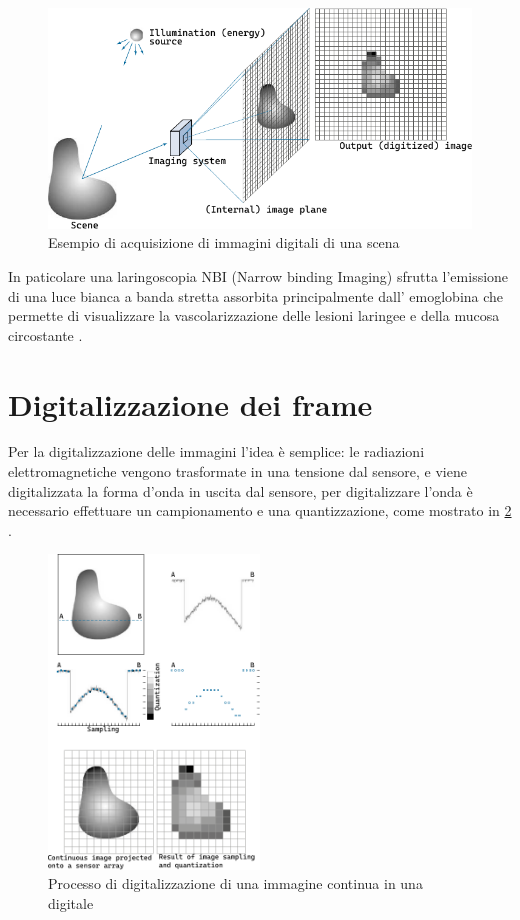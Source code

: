 \begin{figure}[ht]
    \centering
    \includegraphics[width=1\textwidth]{frame/digital_image_acquisition.pdf}
    \caption{Esempio di acquisizione di immagini digitali di una scena}
    \label{fig:scena-acquisizione}
\end{figure}

In paticolare una laringoscopia NBI (Narrow binding Imaging)  sfrutta l’emissione di una luce bianca a banda stretta assorbita principalmente dall’ emoglobina che permette  di visualizzare la vascolarizzazione delle lesioni laringee e della mucosa circostante \cite{giorgio_cenni_2008}.

\section{Digitalizzazione dei frame}\label{digitalizzazione-dei-frame}

Per la digitalizzazione delle immagini l'idea è semplice: le radiazioni elettromagnetiche  vengono trasformate in una tensione dal sensore, e  viene digitalizzata la forma d'onda in uscita dal sensore, per digitalizzare l'onda è necessario effettuare un campionamento e una quantizzazione, come mostrato in \cref{fig:campionamento-quantizzazione} \cite{gonzalez_dip}.

\begin{figure}[ht]
    \centering
    \includegraphics[width=0.5\textwidth]{frame/Sampling-Quantization.pdf}
    \caption{Processo di digitalizzazione di una immagine continua in una digitale}
    \label{fig:campionamento-quantizzazione}
\end{figure}

